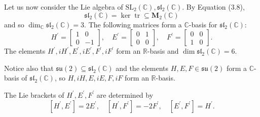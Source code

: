 \documentclass[10pt, letterpaper]{article}
\begin{document}
Let us now consider the Lie algebra of $\mathrm{SL}_{2}(\mathbb{C}), \mathfrak{s} \mathfrak{l}_{2}(\mathbb{C})$. By Equation (3.8),
$$
\mathfrak{s l}_{2}(\mathbb{C})=\operatorname{ker} \operatorname{tr} \subseteq \mathbf{M}_{2}(\mathbb{C})
$$
and so $\operatorname{dim}_{\mathbb{C}} \mathfrak{s l}_{2}(\mathbb{C})=3$. The following matrices form a $\mathbb{C}$-basis for $\mathfrak{s l}_{2}(\mathbb{C})$:
$$
H^{\prime}=\left[\begin{array}{cc}
1 & 0 \\
0 & -1
\end{array}\right], \quad E^{\prime}=\left[\begin{array}{ll}
0 & 1 \\
0 & 0
\end{array}\right], \quad F^{\prime}=\left[\begin{array}{ll}
0 & 0 \\
1 & 0
\end{array}\right] .
$$
The elements $H^{\prime}, i H^{\prime}, E^{\prime}, i E^{\prime}, F^{\prime}, i F^{\prime}$ form an $\mathbb{R}$-basis and $\operatorname{dim} \mathfrak{s l}_{2}(\mathbb{C})=6$. 

Notice also that $\mathfrak{s u}(2) \subseteq \mathfrak{s l}_{2}(\mathbb{C})$ and the elements $H, E, F \in \mathfrak{s u}(2)$ form a $\mathbb{C}$-basis of $\mathfrak{s l}_{2}(\mathbb{C})$, so $H, i H, E, i E, F, i F$ form an $\mathbb{R}$-basis. 

The Lie brackets of $H^{\prime}, E^{\prime}, F^{\prime}$ are determined by
$$
\left[H^{\prime}, E^{\prime}\right]=2 E^{\prime}, \quad\left[H^{\prime}, F^{\prime}\right]=-2 F^{\prime}, \quad\left[E^{\prime}, F^{\prime}\right]=H^{\prime} .
$$
\end{document}
